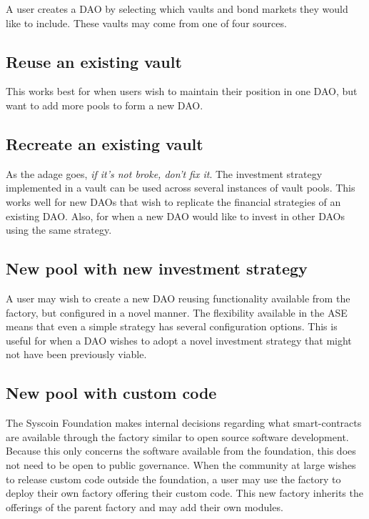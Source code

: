 \documentclass[journal,twocolumn,12pt]{ieeesyscoin}
\begin{document}
A user creates a DAO by selecting which vaults and bond markets they would like to include. These vaults may come from one of four sources.

\subsection{Reuse an existing vault}

This works best for when users wish to maintain their position in one DAO, but want to add more pools to form a new DAO.

\subsection{Recreate an existing vault}

As the adage goes, \textit{if it’s not broke, don’t fix it}. The investment strategy implemented in a vault can be used across several instances of vault pools. This works well for new DAOs that wish to replicate the financial strategies of an existing DAO. Also, for when a new DAO would like to invest in other DAOs using the same strategy.

\subsection{New pool with new investment strategy}

A user may wish to create a new DAO reusing functionality available from the factory, but configured in a novel manner. The flexibility available in the ASE means that even a simple strategy has several configuration options. This is useful for when a DAO wishes to adopt a novel investment strategy that might not have been previously viable.

\subsection{New pool with custom code}

The Syscoin Foundation makes internal decisions regarding what smart-contracts are available through the factory similar to open source software development. Because this only concerns the software available from the foundation, this does not need to be open to public governance. When the community at large wishes to release custom code outside the foundation, a user may use the factory to deploy their own factory offering their custom code. This new factory inherits the offerings of the parent factory and may add their own modules.
\end{document}
